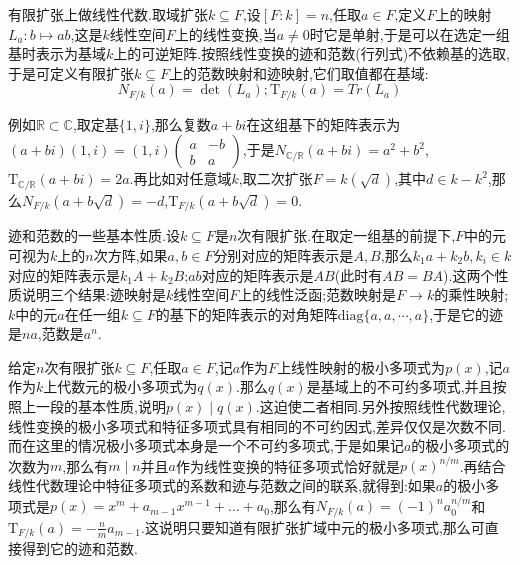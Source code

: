 有限扩张上做线性代数.取域扩张$k\subseteq F$,设$[F:k]=n$,任取$a\in F$,定义$F$上的映射$L_a:b\mapsto ab$,这是$k$线性空间$F$上的线性变换,当$a\not=0$时它是单射,于是可以在选定一组基时表示为基域$k$上的可逆矩阵.按照线性变换的迹和范数(行列式)不依赖基的选取,于是可定义有限扩张$k\subseteq F$上的范数映射和迹映射,它们取值都在基域:
$$N_{F/k}(a)=\det(L_a);\mathrm{T}_{F/k}(a)=Tr(L_a)$$

例如$\mathbb{R}\subset\mathbb{C}$,取定基$\{1,i\}$,那么复数$a+bi$在这组基下的矩阵表示为$(a+bi)(1,i)=(1,i)\left(\begin{array}{cc}
a&-b\\ b&a\end{array}\right)$,于是$N_{\mathbb{C}/\mathbb{R}}(a+bi)=a^2+b^2$,$\mathrm{T}_{\mathbb{C}/\mathbb{R}}(a+bi)=2a$.再比如对任意域$k$,取二次扩张$F=k(\sqrt{d})$,其中$d\in k-k^2$,那么$N_{F/k}(a+b\sqrt{d})=-d$,$\mathrm{T}_{F/k}(a+b\sqrt{d})=0$.

迹和范数的一些基本性质.设$k\subseteq F$是$n$次有限扩张.在取定一组基的前提下,$F$中的元可视为$k$上的$n$次方阵,如果$a,b\in F$分别对应的矩阵表示是$A,B$,那么$k_1a+k_2b,k_i\in k$对应的矩阵表示是$k_1A+k_2B$;$ab$对应的矩阵表示是$AB$(此时有$AB=BA$).这两个性质说明三个结果:迹映射是$k$线性空间$F$上的线性泛函;范数映射是$F\to k$的乘性映射;$k$中的元$a$在任一组$k\subseteq F$的基下的矩阵表示的对角矩阵$\mathrm{diag}\{a,a,\cdots,a\}$,于是它的迹是$na$,范数是$a^n$.

给定$n$次有限扩张$k\subseteq F$,任取$a\in F$,记$a$作为$F$上线性映射的极小多项式为$p(x)$,记$a$作为$k$上代数元的极小多项式为$q(x)$.那么$q(x)$是基域上的不可约多项式,并且按照上一段的基本性质,说明$p(x)\mid q(x)$.这迫使二者相同.另外按照线性代数理论,线性变换的极小多项式和特征多项式具有相同的不可约因式,差异仅仅是次数不同.而在这里的情况极小多项式本身是一个不可约多项式,于是如果记$a$的极小多项式的次数为$m$,那么有$m\mid n$并且$a$作为线性变换的特征多项式恰好就是$p(x)^{n/m}$.再结合线性代数理论中特征多项式的系数和迹与范数之间的联系,就得到:如果$a$的极小多项式是$p(x)=x^m+a_{m-1}x^{m-1}+\dots+a_0$,那么有$N_{F/k}(a)=(-1)^na_0^{n/m}$和$\mathrm{T}_{F/k}(a)=-\frac{n}{m}a_{m-1}$.这说明只要知道有限扩张扩域中元的极小多项式,那么可直接得到它的迹和范数.

